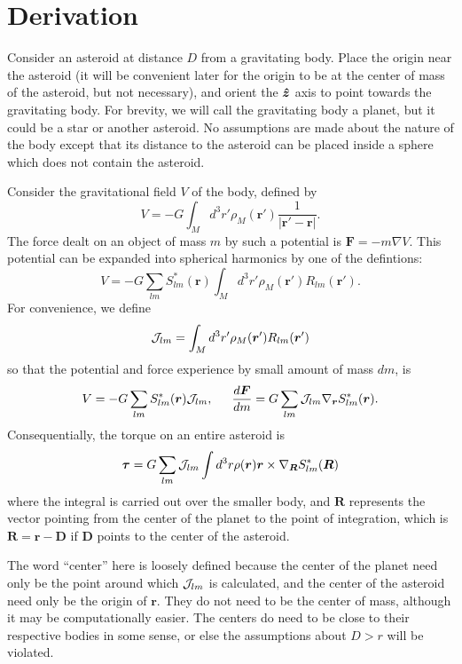 \documentclass[aps,twocolumn,secnumarabic,balancelastpage,amsmath,amssymb,nofootinbib,floatfix]{revtex4-1}
\begin{document}
\section{Derivation}
Consider an asteroid at distance $D$ from a gravitating body. Place the origin near the asteroid (it will be convenient later for the origin to be at the center of mass of the asteroid, but not necessary), and orient the $\bm{\hat z}$ axis to point towards the gravitating body. For brevity, we will call the gravitating body a planet, but it could be a star or another asteroid. No assumptions are made about the nature of the body except that its distance to the asteroid can be placed inside a sphere which does not contain the asteroid.

Consider the gravitational field $V$ of the body, defined by
$$V = -G\int_M d^3 r' \rho_M(\bm r')\frac{1}{|\bm r' - \bm r|}.$$
The force dealt on an object of mass $m$ by such a potential is $\bm F = -m\nabla V$. This potential can be expanded into spherical harmonics by one of the defintions:
$$V = -G\sum_{lm}S^*_{lm}(\bm r)\int_M d^3 r' \rho_M(\bm r')R_{lm}(\bm r').$$
For convenience, we define
$$\mathcal{J}_{lm} = \int_M d^3 r' \rho_M(\bm r')R_{lm}(\bm r')$$
so that the potential and force experience by small amount of mass $dm$, is
$$V = -G\sum_{lm}S^*_{lm}(\bm r)\J_{lm},\indent \frac{d\bm F}{dm}=G\sum_{lm}\J_{lm} \nabla_{\bm r} S^*_{lm}(\bm r).$$
Consequentially, the torque on an entire asteroid is
$$\bm \tau = G\sum_{lm}\mathcal{J}_{lm} \int d^3 r\rho(\bm r)\bm r \times \nabla_{\bm R} S^*_{lm}(\bm R)$$
where the integral is carried out over the smaller body, and $\bm R$ represents the vector pointing from the center of the planet to the point of integration, which is $\bm R = \bm r - \bm D$ if $\bm D$ points to the center of the asteroid.

The word ``center'' here is loosely defined because the center of the planet need only be the point around which $\mathcal{J}_{lm}$ is calculated, and the center of the asteroid need only be the origin of $\bm r$. They do not need to be the center of mass, although it may be computationally easier. The centers do need to be close to their respective bodies in some sense, or else the assumptions about $D > r$ will be violated.
\end{document}

